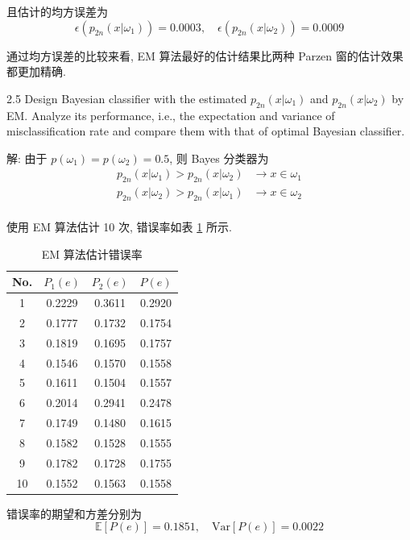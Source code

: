 \documentclass[openany]{ctexbook}
\theoremstyle{kaiti}
\theoremstyle{normal}
\begin{document}
且估计的均方误差为
\begin{equation}
  \epsilon(p_{2n}(x|\omega_1))=0.0003,\quad \epsilon(p_{2n}(x|\omega_2))=0.0009
\end{equation}

通过均方误差的比较来看, EM 算法最好的估计结果比两种 Parzen 窗的估计效果都更加精确.

2.5 Design Bayesian classifier with the estimated $p_{2n}(x|\omega_{1})$ and $p_{2n}(x|\omega_{2})$ by EM. Analyze its performance, i.e., the expectation and variance of misclassification rate and compare them with that of optimal Bayesian classifier.

解: 由于 $p(\omega_{1})=p(\omega_{2})= 0.5$, 则 Bayes 分类器为
\begin{equation}
  \begin{aligned}
    p_{2n}(x|\omega_1) > p_{2n}(x|\omega_2) &\to x\in\omega_1\\
    p_{2n}(x|\omega_2) > p_{2n}(x|\omega_1) &\to x\in\omega_2\\
  \end{aligned}
\end{equation}

使用 EM 算法估计 10 次, 错误率如表 \ref{tab:emErr} 所示.

\begin{table}[htbp]
  \centering
  \caption{EM 算法估计错误率}
  \label{tab:emErr}
  \begin{tabular}{c|ccc}
    \hline
    No. & $P_1(e)$ & $P_2(e)$ & $P(e)$ \\
    \hline
    1  & 0.2229  & 0.3611 & 0.2920 \\
    2  & 0.1777  & 0.1732 & 0.1754 \\
    3  & 0.1819  & 0.1695 & 0.1757 \\
    4  & 0.1546  & 0.1570 & 0.1558 \\
    5  & 0.1611  & 0.1504 & 0.1557 \\
    6  & 0.2014  & 0.2941 & 0.2478 \\
    7  & 0.1749  & 0.1480 & 0.1615 \\
    8  & 0.1582  & 0.1528 & 0.1555 \\
    9  & 0.1782  & 0.1728 & 0.1755 \\
    10 & 0.1552  & 0.1563 & 0.1558 \\
    \hline  
  \end{tabular}
\end{table}

错误率的期望和方差分别为
\begin{equation}
  \mathbb{E}[P(e)]=0.1851,\quad \mathrm{Var}[P(e)]=0.0022
\end{equation}
\end{document}
